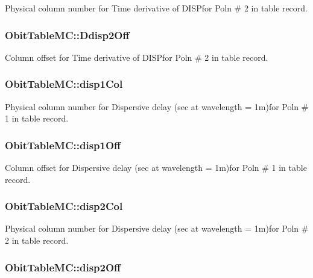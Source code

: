 Physical column number for Time derivative of DISPfor Poln \# 2 in table record. 

\subsubsection{ {\bf Obit\-Table\-MC::Ddisp2Off}}\label{structObitTableMC_o70}


Column offset for Time derivative of DISPfor Poln \# 2 in table record. 

\subsubsection{ {\bf Obit\-Table\-MC::disp1Col}}\label{structObitTableMC_o57}


Physical column number for Dispersive delay (sec at wavelength = 1m)for Poln \# 1 in table record. 

\subsubsection{ {\bf Obit\-Table\-MC::disp1Off}}\label{structObitTableMC_o56}


Column offset for Dispersive delay (sec at wavelength = 1m)for Poln \# 1 in table record. 

\subsubsection{ {\bf Obit\-Table\-MC::disp2Col}}\label{structObitTableMC_o69}


Physical column number for Dispersive delay (sec at wavelength = 1m)for Poln \# 2 in table record. 

\subsubsection{ {\bf Obit\-Table\-MC::disp2Off}}\label{structObitTableMC_o68}


